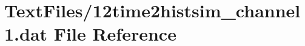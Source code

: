 \hypertarget{12time2histsim__channel1_8dat}{}\section{Text\+Files/12time2histsim\+\_\+channel1.dat File Reference}
\label{12time2histsim__channel1_8dat}
